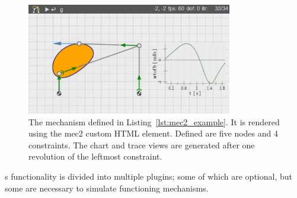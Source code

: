 \begin{figure}
    \centering
    \includegraphics[width=0.8\textwidth]{images/mec2_chart.png}
    \caption[Example of the mec2 HTML element]{The mechanism defined in Listing~\ref{lst:mec2_example}. It is rendered using the mec2 custom HTML element. Defined are five nodes and 4 constraints. The chart and trace views are generated after one revolution of the leftmost constraint. }\label{fig:generated_data_samples}
\end{figure}

s functionality is divided into multiple plugins; some of which are optional, but some are necessary to simulate functioning mechanisms.

